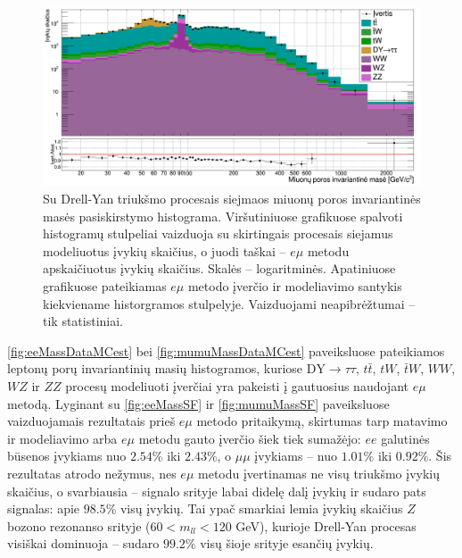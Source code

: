 \documentclass[a4paper, 12pt]{article}
\newcommand{\tbarW}{\bar{t}W}
\newcommand{\ttbar}{t\bar{t}}
\newcommand{\emu}{e\mu}
\newcommand{\mumu}{\mu\mu}
\newcommand{\DYtau}{\mathrm{DY} \! \rightarrow \! \tau\tau}
\begin{document}
\begin{figure}
	\includegraphics[width=\linewidth]{mumuMassEst_BIG.png}
	\caption{\label{fig:mumuEst} \small
		Su Drell-Yan triukšmo procesais siejmaos miuonų poros invariantinės masės pasiskirstymo histograma.
		Viršutiniuose grafikuose spalvoti histogramų stulpeliai vaizduoja su skirtingais procesais siejamus modeliuotus įvykių
		skaičius, o juodi taškai -- $\emu$ metodu apskaičiuotus įvykių skaičius.
		Skalės -- logaritminės.
		Apatiniuose grafikuose pateikiamas $\emu$ metodo įverčio ir modeliavimo santykis kiekviename historgramos stulpelyje.
		Vaizduojami neapibrėžtumai -- tik statistiniai.
	}
\end{figure}

\ref{fig:eeMassDataMCest} bei \ref{fig:mumuMassDataMCest} paveiksluose pateikiamos leptonų porų invariantinių masių
histogramos, kuriose $\DYtau$, $\ttbar$, $tW$, $\tbarW$, $WW$, $WZ$ ir $ZZ$ procesų modeliuoti įverčiai yra pakeisti
į gautuosius naudojant $\emu$ metodą.
Lyginant su \ref{fig:eeMassSF} ir \ref{fig:mumuMassSF} paveiksluose vaizduojamais rezultatais prieš $\emu$ metodo
pritaikymą, skirtumas tarp matavimo ir modeliavimo arba $\emu$ metodu gauto įverčio šiek tiek sumažėjo: $ee$ galutinės būsenos
įvykiams nuo $2.54\%$ iki $2.43\%$, o $\mumu$ įvykiams -- nuo $1.01\%$ iki $0.92\%$.
Šis rezultatas atrodo nežymus, nes $\emu$ metodu įvertinamas ne visų triukšmo įvykių skaičius, o svarbiausia --
signalo srityje labai didelę dalį įvykių ir sudaro pats signalas: apie $98.5\%$ visų įvykių.
Tai ypač smarkiai lemia įvykių skaičius $Z$ bozono rezonanso srityje ($60<m_{ll}<120$ GeV), kurioje Drell-Yan procesas
visiškai dominuoja -- sudaro $99.2\%$ visų šioje srityje esančių įvykių.
\end{document}
